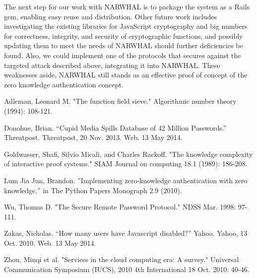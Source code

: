 \documentclass[11pt]{article}
\begin{document}
The next step for our work with NARWHAL is to package the system as a Rails gem, enabling easy reuse and distribution.  Other future work includes investigating the existing libraries for JavaScript cryptography and big numbers for correctness, integrity, and security of cryptographic functions, and possibly updating them to meet the needs of NARWHAL should further deficiencies be found.  Also, we could implement one of the protocols that secures against the targeted attack described above, integrating it into NARWHAL. These weaknesses aside, NARWHAL still stands as an effective proof of concept of the zero knowledge authentication concept.

\begin{thebibliography}{9}
Adleman, Leonard M. "The function field sieve." Algorithmic number theory (1994): 108-121.

Donohue, Brian. “Cupid Media Spills Database of 42 Million Passwords.” Threatpost. Threatpost, 20 Nov. 2013. Web. 13 May 2014.

Goldwasser, Shafi, Silvio Micali, and Charles Rackoff. "The knowledge complexity of interactive proof systems." SIAM Journal on computing 18.1 (1989): 186-208.

Lum Jia Jun, Brandon. ”Implementing zero-knowledge authentication with zero knowledge,” in The Python Papers Monograph 2.9 (2010).

Wu, Thomas D. "The Secure Remote Password Protocol." NDSS Mar. 1998: 97-111.

Zakas, Nicholas. “How many users have Javascript disabled?” Yahoo. Yahoo, 13 Oct. 2010. Web. 13 May 2014.

Zhou, Minqi et al. "Services in the cloud computing era: A survey." Universal Communication Symposium (IUCS), 2010 4th International 18 Oct. 2010: 40-46.

\end{thebibliography}
\end{document}
